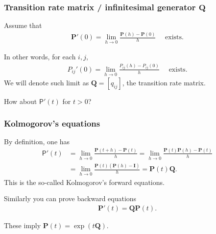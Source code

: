 \documentclass[letterpaper,handout, mathserif]{beamer}
\begin{document}
\begin{frame}
	\frametitle{Transition rate matrix / infinitesimal generator $\mathbf{Q}$}
	Assume that 
	\begin{align*}
		\mathbf{P}'(0) = \lim_{h \to 0} \frac{\mathbf{P}(h) - \mathbf{P}(0)}{h} \quad \text{ exists}.
	\end{align*}
	
	In other words, for each $i,j$,
	\begin{align*}
		P_{ij}'(0) = \lim_{h \to 0} \frac{{P}_{ij}(h) - {P}_{ij}(0)}{h} \quad \text{ exists}.
	\end{align*}
	\vfill
	We will denote such limit as $\mathbf{Q} = [q_{ij}]$, the transition rate matrix.
	
	How about $\mathsf{P}'(t)$ for $t > 0$?
\end{frame}

\begin{frame}
	\frametitle{Kolmogorov's equations}
	
	
	By definition, one has
	\begin{align*}
		\mathsf{P}'(t) &= \lim_{h \to 0} \frac{\mathbf{P}(t+h) - \mathbf{P}(t) }{h} 
		= \lim_{h \to 0} \frac{\mathbf{P}(t)\mathbf{P}(h) - \mathbf{P}(t)}{h} \\
		       &=  \lim_{h \to 0} \frac{\mathbf{P}(t) ( \mathbf{P}(h) - \mathbf{I}) }{h} 
		       = \mathbf{P}(t) \mathbf{Q}.
	\end{align*}
	This is the so-called Kolmogorov's forward equations.
	
	\vfill
	Similarly you can prove backward equations
	\begin{align*}
		\mathbf{P}'(t) = \mathbf{Q} \mathbf{P}(t).
	\end{align*}
	
	\vfill These imply $\mathbf{P}(t) = \exp(t\mathbf{Q})$.
\end{frame}
\end{document}
